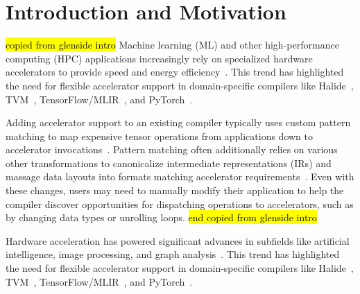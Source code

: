 \chapter{ Introduction and Motivation}
\label{sec:part1-motivation}

\hl{copied from glenside intro}
Machine learning (ML) and other
  high-performance computing (HPC)
  applications increasingly rely on
  specialized hardware accelerators to
  provide speed and energy efficiency~\cite{jouppi2017tpu, krizhevsky2012conv, reuther2019survey}.
This trend has highlighted the need
  for flexible accelerator support
  in domain-specific compilers like
  Halide~\cite{halide},
  TVM~\cite{chen2018tvm},
  TensorFlow/MLIR~\cite{tensorflow, mlir}, and
  PyTorch~\cite{pytorch}.

Adding accelerator support to
  an existing compiler typically
  uses custom pattern matching to
  map expensive tensor operations
  from applications down to
  accelerator invocations~\cite{
    yang2020interstellar, byoc}.
Pattern matching often additionally relies on
  various other transformations
  to canonicalize intermediate representations (IRs)
  and massage data layouts into
  formats matching accelerator requirements~\cite{nvidia2020nhwc}.
Even with these changes,
  users may need to manually modify their application to
  help the compiler discover opportunities
  for dispatching operations to accelerators, 
  such as by changing data types or unrolling loops.
\hl{end copied from glenside intro}





Hardware acceleration has powered significant advances
  in subfields like artificial intelligence, image processing, and graph analysis~\cite{han2016eie,chen2016eyeriss,reagen2016minerva,zhang2016cambricon,hameed2010understanding,ham2016graphicionado,jouppi2017tpu, krizhevsky2012conv, reuther2019survey}.
This trend has highlighted the need
  for flexible accelerator support
  in domain-specific compilers like
  Halide~\cite{halide},
  TVM~\cite{chen2018tvm},
  TensorFlow/MLIR~\cite{tensorflow, mlir}, and
  PyTorch~\cite{pytorch}.

